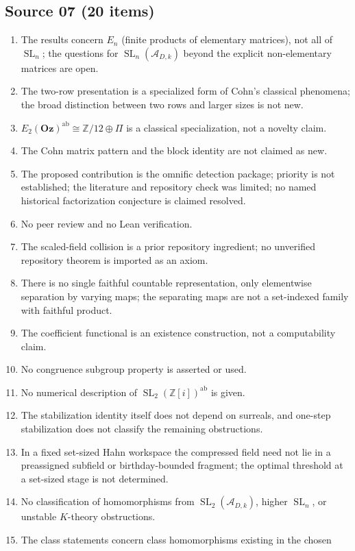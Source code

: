 \documentclass[11pt,oneside]{article}
\numberwithin{equation}{section}
\theoremstyle{definition}
\theoremstyle{remark}
\newcommand{\Oz}{\mathbf{Oz}}
\newcommand{\Z}{\mathbb Z}
\newcommand{\A}{\mathcal A}
\newcommand{\SL}{\operatorname{SL}}
\newcommand{\ab}{\mathrm{ab}}
\begin{document}
\subsection{Source 07 (20 items)}
\begin{enumerate}[leftmargin=*,widest=00,label=07.\arabic*]
\item The results concern $E_n$ (finite products of elementary matrices), not all
of $\SL_n$; the questions for $\SL_n(\A_{D,k})$ beyond the explicit non-elementary
matrices are open.
\item The two-row presentation is a specialized form of Cohn's classical
phenomena; the broad distinction between two rows and larger sizes is not new.
\item $E_2(\Oz)^{\ab}\cong\Z/12\oplus\Pi$ is a classical specialization, not a
novelty claim.
\item The Cohn matrix pattern and the block identity are not claimed as new.
\item The proposed contribution is the omnific detection package; priority is not
established; the literature and repository check was limited; no named historical
factorization conjecture is claimed resolved.
\item No peer review and no Lean verification.
\item The scaled-field collision is a prior repository ingredient; no unverified
repository theorem is imported as an axiom.
\item There is no single faithful countable representation, only elementwise
separation by varying maps; the separating maps are not a set-indexed family with
faithful product.
\item The coefficient functional is an existence construction, not a
computability claim.
\item No congruence subgroup property is asserted or used.
\item No numerical description of $\SL_2(\Z[i])^{\ab}$ is given.
\item The stabilization identity itself does not depend on surreals, and one-step
stabilization does not classify the remaining obstructions.
\item In a fixed set-sized Hahn workspace the compressed field need not lie in a
preassigned subfield or birthday-bounded fragment; the optimal threshold at a
set-sized stage is not determined.
\item No classification of homomorphisms from $\SL_2(\A_{D,k})$, higher $\SL_n$, or
unstable $K$-theory obstructions.
\item The class statements concern class homomorphisms existing in the chosen

\end{enumerate}
\end{document}
